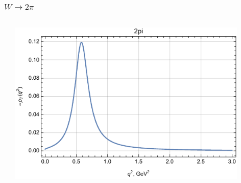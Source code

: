 \documentclass{beamer}
\begin{document}
\begin{frame}
  \frametitle{$W \to  2\pi$}
  \begin{columns}
    \begin{column}{0.5\textwidth}
    \end{column}
    \begin{column}{0.5\textwidth}
  \includegraphics[width=0.9\textwidth]{figs/rhoT_2pi_q2}
    \end{column}
  \end{columns}
\end{frame}
\end{document}
